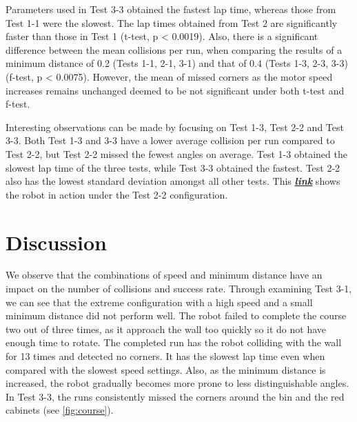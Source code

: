 \documentclass[a4paper,12pt]{article}
\begin{document}
Parameters used in Test 3-3 obtained the fastest lap time, whereas those from Test 1-1 were the slowest. The lap times obtained from Test 2 are significantly faster than those in Test 1 (t-test, p < 0.0019). Also, there is a significant difference between the mean collisions per run, when comparing the results of a minimum distance of 0.2 (Tests 1-1, 2-1, 3-1) and that of 0.4 (Tests 1-3, 2-3, 3-3) (f-test, p < 0.0075). However, the mean of missed corners as the motor speed increases remains unchanged deemed to be not significant under both t-test and f-test.

Interesting observations can be made by focusing on Test 1-3, Test 2-2 and Test 3-3. Both Test 1-3 and 3-3 have a lower average collision per run compared to Test 2-2, but Test 2-2 missed the fewest angles on average. Test 1-3 obtained the slowest lap time of the three tests, while Test 3-3 obtained the fastest. Test 2-2 also has the lowest standard deviation amongst all other tests. This \href{https://goo.gl/photos/G1PmLfxJktHRtpsm6}{\textbf{\textit{link}}} shows the robot in action under the Test 2-2 configuration. 



\section{Discussion}
We observe that the combinations of speed and minimum distance have an impact on the number of collisions and success rate. Through examining Test 3-1, we can see that the extreme configuration with a high speed and a small minimum distance did not perform well. The robot failed to complete the course two out of three times, as it approach the wall too quickly so it do not have enough time to rotate. The completed run has the robot colliding with the wall for 13 times and detected no corners. It has the slowest lap time even when compared with the slowest speed settings. Also, as the minimum distance is increased, the robot gradually becomes more prone to less distinguishable angles. In Test 3-3, the runs consistently missed the corners around the bin and the red cabinets (see \autoref{fig:course}).
\end{document}
